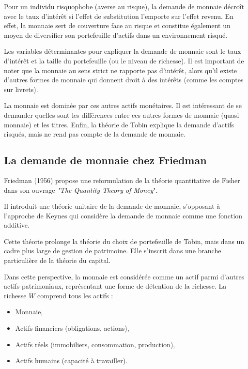 \documentclass[a4paper, 12pt]{report}
\begin{document}
Pour un individu risquophobe (averse au risque), la demande de monnaie décroît avec le taux d'intérêt si l'effet de substitution l'emporte sur l'effet revenu. En effet, la monnaie sert de couverture face au risque et constitue également un moyen de diversifier son portefeuille d'actifs dans un environnement risqué.

Les variables déterminantes pour expliquer la demande de monnaie sont le taux d'intérêt et la taille du portefeuille (ou le niveau de richesse). Il est important de noter que la monnaie au sens strict ne rapporte pas d'intérêt, alors qu'il existe d'autres formes de monnaie qui donnent droit à des intérêts (comme les comptes sur livrets).

La monnaie est dominée par ces autres actifs monétaires. Il est intéressant de se demander quelles sont les différences entre ces autres formes de monnaie (quasi-monnaie) et les titres. Enfin, la théorie de Tobin explique la demande d'actifs risqués, mais ne rend pas compte de la demande de monnaie.
	
\subsection{La demande de monnaie chez Friedman}

Friedman (1956) propose une reformulation de la théorie quantitative de Fisher dans son ouvrage \textit{"The Quantity Theory of Money}". 

Il introduit une théorie unitaire de la demande de monnaie, s'opposant à l'approche de Keynes qui considère la demande de monnaie comme une fonction additive.

Cette théorie prolonge la théorie du choix de portefeuille de Tobin, mais dans un cadre plus large de gestion de patrimoine. Elle s'inscrit dans une branche particulière de la théorie du capital.

Dans cette perspective, la monnaie est considérée comme un actif parmi d'autres actifs patrimoniaux, représentant une forme de détention de la richesse. La richesse \( W \) comprend tous les actifs : 

\begin{itemize}
	\item Monnaie,
	\item Actifs financiers (obligations, actions),
	\item Actifs réels (immobiliers, consommation, production),
	\item Actifs humains (capacité à travailler).
\end{itemize}
\end{document}
